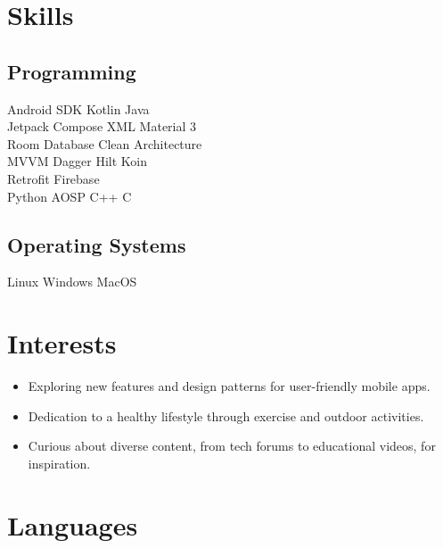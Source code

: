 \documentclass[bold]{deedy-resume-openfont}
\begin{document}
\begin{minipage}[t]{0.33\textwidth}

\section{Skills}
\subsection{Programming}
Android SDK \textbullet{} Kotlin \textbullet{} Java \\
Jetpack Compose \textbullet{} XML \textbullet{} Material 3  \\
Room Database \textbullet{} Clean Architecture \\ 
MVVM \textbullet{} Dagger Hilt \textbullet{} Koin \\ 
Retrofit \textbullet{} Firebase  \\
Python \textbullet{} AOSP \textbullet{} C++ \textbullet{} C \\
\vspace{\topsep} %
\subsection{Operating Systems}
Linux \textbullet{} Windows \textbullet{} MacOS
\sectionsep


\section*{Interests}
\begin{itemize}[leftmargin=0pt]
    \item {} Exploring new features and design patterns for user-friendly mobile apps.
    \item {} Dedication to a healthy lifestyle through exercise and outdoor activities.
    \item {} Curious about diverse content, from tech forums to educational videos, for inspiration.
\end{itemize}


\section{Languages}

\end{minipage}
\end{document}
